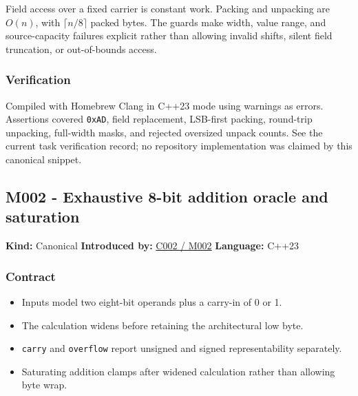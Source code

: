 \hypertarget{appendix-4e2236f53445-cost-and-failure-behavior}{}

Field access over a fixed carrier is constant work. Packing and unpacking are \(O(n)\), with \(\lceil n/8\rceil\) packed bytes. The guards make width, value range, and source-capacity failures explicit rather than allowing invalid shifts, silent field truncation, or out-of-bounds access.

\subsubsection{Verification}\label{appendix-4e2236f53445-verification}

\hypertarget{appendix-4e2236f53445-verification}{}

Compiled with Homebrew Clang in C++23 mode using warnings as errors. Assertions covered \texttt{0xAD}, field replacement, LSB-first packing, round-trip unpacking, full-width masks, and rejected oversized unpack counts. See the current task verification record; no repository implementation was claimed by this canonical snippet.

\subsection{M002 - Exhaustive 8-bit addition oracle and saturation}\label{appendix-4e2236f53445-m002---exhaustive-8-bit-addition-oracle-and-saturation}

\hypertarget{appendix-4e2236f53445-m002---exhaustive-8-bit-addition-oracle-and-saturation}{}

\textbf{Kind:} Canonical \textbf{Introduced by:} \hyperref[01-foundations-i-ch001-arithmetic-becomes-a-policy]{C002 / M002} \textbf{Language:} C++23

\subsubsection{Contract}\label{appendix-4e2236f53445-contract-1}

\hypertarget{appendix-4e2236f53445-contract-1}{}

\begin{itemize}
\tightlist
\item
  Inputs model two eight-bit operands plus a carry-in of 0 or 1.
\item
  The calculation widens before retaining the architectural low byte.
\item
  \texttt{carry} and \texttt{overflow} report unsigned and signed representability separately.
\item
  Saturating addition clamps after widened calculation rather than allowing byte wrap.
\end{itemize}

